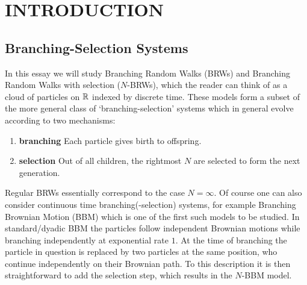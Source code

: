 \section{INTRODUCTION}

\subsection{Branching-Selection Systems}
In this essay we will study Branching Random Walks (BRWs) and Branching Random Walks with selection ($N$-BRWs), which the reader can think of as a cloud of particles on $\mathbb{R}$ indexed by discrete time. These models form a subset of the more general class of `branching-selection' systems which in general evolve according to two mechanisms:
\begin{enumerate}[1]
\item \vspace{-2mm}\textbf{branching} Each particle gives birth to offspring. 
\item \vspace{-2mm}\textbf{selection} Out of all children, the rightmost $N$ are selected to form the next generation.
\end{enumerate}
Regular BRWs essentially correspond to the case $N = \infty$. Of course one can also consider continuous time branching(-selection) systems, for example Branching Brownian Motion (BBM) which is one of the first such models to be studied. In standard/dyadic BBM the particles follow independent Brownian motions while branching independently at exponential rate $1$. At the time of branching the particle in question is replaced by two particles at the same position, who continue independently on their Brownian path. To this description it is then straightforward to add the selection step, which results in the $N$-BBM model. \\




